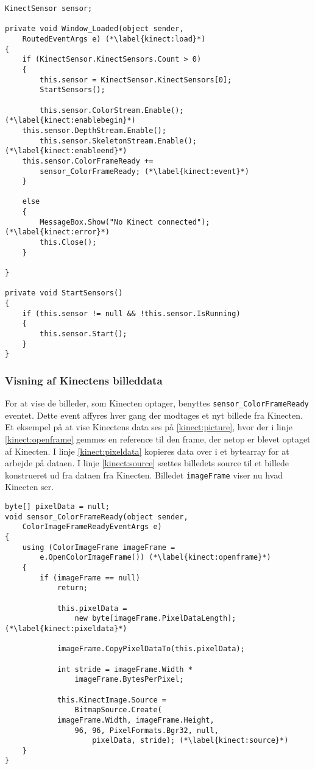 \begin{lstlisting}[style=csharp, label=kinect:initialisering, caption={Initialisering af en Kinect sensor.}]
KinectSensor sensor;

private void Window_Loaded(object sender,
	RoutedEventArgs e) (*\label{kinect:load}*)
{
    if (KinectSensor.KinectSensors.Count > 0)
    {
        this.sensor = KinectSensor.KinectSensors[0];
        StartSensors();
        
        this.sensor.ColorStream.Enable();(*\label{kinect:enablebegin}*)    
	this.sensor.DepthStream.Enable();
        this.sensor.SkeletonStream.Enable();(*\label{kinect:enableend}*)
	this.sensor.ColorFrameReady += 
		sensor_ColorFrameReady; (*\label{kinect:event}*)
    }

    else
    {
        MessageBox.Show("No Kinect connected"); (*\label{kinect:error}*)
        this.Close();
    }

}

private void StartSensors()
{
    if (this.sensor != null && !this.sensor.IsRunning)
    {
        this.sensor.Start();
    }
}
\end{lstlisting}

\subsubsection{Visning af Kinectens billeddata}
For at vise de billeder, som Kinecten optager, benyttes \lstinline[style=csharp]!sensor_ColorFrameReady! eventet. 
Dette event affyres hver gang der modtages et nyt billede fra Kinecten. 
Et eksempel på at vise Kinectens data ses på \cref{kinect:picture}, hvor der i linje \ref{kinect:openframe} gemmes en reference til den frame, der netop er blevet optaget af Kinecten.
I linje \ref{kinect:pixeldata} kopieres data over i et bytearray for at arbejde på dataen. 
I linje \ref{kinect:source} sættes billedets source til et billede konstrueret ud fra dataen fra Kinecten.
Billedet \lstinline[style=csharp]|imageFrame| viser nu hvad Kinecten ser.

\begin{lstlisting}[style=csharp,caption={Visning af billeddata fra Kinectens RGB-kamera.}, label=kinect:picture]
byte[] pixelData = null;
void sensor_ColorFrameReady(object sender,
	ColorImageFrameReadyEventArgs e)
{
    using (ColorImageFrame imageFrame = 
    	e.OpenColorImageFrame()) (*\label{kinect:openframe}*)
    {
        if (imageFrame == null)
            return;

            this.pixelData = 
            	new byte[imageFrame.PixelDataLength];(*\label{kinect:pixeldata}*)

            imageFrame.CopyPixelDataTo(this.pixelData);

            int stride = imageFrame.Width *
            	imageFrame.BytesPerPixel;

            this.KinectImage.Source = 
            	BitmapSource.Create(
            imageFrame.Width, imageFrame.Height, 
            	96, 96, PixelFormats.Bgr32, null, 
            		pixelData, stride); (*\label{kinect:source}*)
    }
}    
\end{lstlisting}